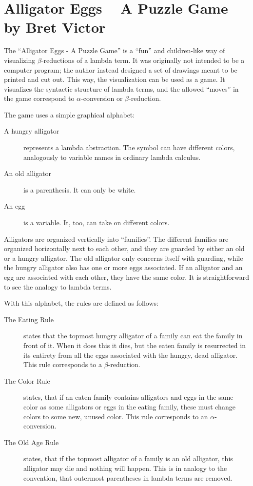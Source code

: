 \section{Alligator Eggs -- A Puzzle Game by Bret Victor}

The ``Alligator Eggs - A Puzzle Game'' \cite{Alligator} is a ``fun'' and
children-like way of visualizing $\beta$-reductions of a lambda term. It was
originally not intended to be a computer program; the author instead designed
a set of drawings meant to be printed and cut out. This way, the visualization
can be used as a game. It visualizes the syntactic structure of lambda
terms, and the allowed ``moves'' in the game correspond to $\alpha$-conversion or
$\beta$-reduction.

The game uses a simple graphical alphabet:
\begin{description}
	\item[A hungry alligator] represents a lambda abstraction. The symbol can
	have different colors, analogously to variable names in ordinary lambda calculus.
	\item[An old alligator] is a parenthesis. It can only be white.
	\item[An egg] is a variable. It, too, can take on different colors.
\end{description}
Alligators are organized vertically into ``families''. The different families
are organized horizontally next to each other, and they are guarded by either an
old or a hungry alligator. The old alligator only concerns itself with
guarding, while the hungry alligator also has one or more eggs associated. If
an alligator and an egg are associated with each other, they have the same
color. It is straightforward to see the analogy to lambda terms.

With this alphabet, the rules are defined as follows:
\begin{description}
	\item[The Eating Rule] states that the topmost hungry alligator of a family can
	eat the family in front of it. When it does this it dies, but the eaten family
	is resurrected in its entirety from all the eggs associated with the hungry, dead
	alligator. This rule corresponds to a $\beta$-reduction. 
	\item[The Color Rule] states, that if an eaten family contains alligators and eggs
	in the same color as some alligators or eggs in the eating family, these must change colors
	to some new, unused color. This rule corresponds to an $\alpha$-conversion.
	\item[The Old Age Rule] states, that if the topmost alligator of a family is
	an old alligator, this alligator may die and nothing will happen. This is in analogy
	to the convention, that outermost parentheses in lambda terms are removed.
\end{description}


